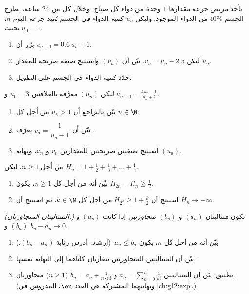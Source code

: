 \begin{exercise}[$\star\star$]\label{exo:g12:seq:7}
يأخذ مريض جرعة مقدارها $1$ وحدة من دواء كل صباح. وخلال كل
 من 24 ساعة، يطرح الجسم $40\%$ من الدواء الموجود. وليكن $u_n$
كمية الدواء في الجسم بُعيد جرعة اليوم $n$، بحيث
$u_0 = 1$.
\begin{enumerate}
  \item برّر أن $u_{n+1} = 0.6\,u_n + 1$.
  \item ليكن $v_n = u_n - 2.5$. بيّن أن $(v_n)$  واستنتج
        صيغة صريحة للمقدار $u_n$.
  \item حدّد كمية الدواء في الجسم على  الطويل.
\end{enumerate}
\end{exercise}

\begin{exercise}[$\star\star$]\label{exo:g12:seq:8}
لتكن $(u_n)$ معرَّفة بالعلاقتين $u_0 = 3$ و $u_{n+1} = \frac{4u_n - 1}{u_n + 2}$.
\begin{enumerate}
  \item بيّن بالتراجع أن $u_n > 1$ من أجل كل $n \in \N$.
  \item بيّن أن $v_n = \dfrac{1}{u_n - 1}$ يعرّف .
  \item استنتج صيغتين صريحتين للمقدارين $v_n$ و $u_n$، ونهاية
        $(u_n)$.
\end{enumerate}
\end{exercise}

\begin{exercise}[$\star\star\star$]\label{exo:g12:seq:9}
من أجل $n \geq 1$، ليكن
$H_n = 1 + \frac{1}{2} + \frac{1}{3} + \dots + \frac{1}{n}$.
\begin{enumerate}
  \item بيّن أنه من أجل كل $n \geq 1$، يكون $H_{2n} - H_n \geq \frac{1}{2}$.
  \item استنتج أن $H_{2^k} \geq 1 + \frac{k}{2}$ من أجل كل $k \in \N$، ثم
        استنتج أن $H_n \to +\infty$.
\end{enumerate}
\end{exercise}

\begin{exercise}[$\star\star\star$]\label{exo:g12:seq:10}
\emph{(المتتاليتان المتجاورتان.)} تكون متتاليتان $(a_n)$ و $(b_n)$
\emph{متجاورتين} إذا كانت $(a_n)$  و $(b_n)$  و
$b_n - a_n \to 0$.
\begin{enumerate}
  \item بيّن أنه من أجل كل $n$، يكون $a_n \leq b_n$. (إرشاد: ادرس رتابة
         $(b_n - a_n)$.)
  \item بيّن أن المتتاليتين المتجاورتين تتقاربان كلتاهما إلى النهاية نفسها.
  \item تطبيق: بيّن أن المتتاليتين
        $a_n = \sum_{k=0}^{n} \frac{1}{k!}$ و
        $b_n = a_n + \frac{1}{n \cdot n!}$ ($n \geq 1$) متجاورتان. (ونهايتهما
        المشتركة هي العدد $\eu$، المدروس في \cref{ch:g12:exp}.)
\end{enumerate}
\end{exercise}


